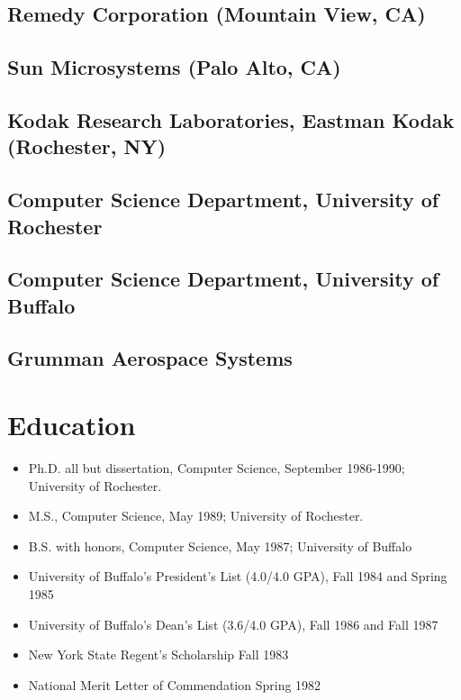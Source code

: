 \documentclass[11pt]{article}
\begin{document}
\subsection*{Remedy Corporation (Mountain View, CA)}
\label{sec-4-6}
\subsection*{Sun Microsystems (Palo Alto, CA)}
\label{sec-4-7}
\subsection*{Kodak Research Laboratories, Eastman Kodak (Rochester, NY)}
\label{sec-4-8}
\subsection*{Computer Science Department, University of Rochester}
\label{sec-4-9}
\subsection*{Computer Science Department, University of Buffalo}
\label{sec-4-10}
\subsection*{Grumman Aerospace Systems}
\label{sec-4-11}
\section*{Education}
\label{sec-5}

\begin{itemize}
\item Ph.D. all but dissertation, Computer Science, September 1986-1990; University of Rochester.
\item M.S., Computer Science, May 1989; University of Rochester.
\item B.S. with honors, Computer Science, May 1987; University of Buffalo
\item University of Buffalo's President's List (4.0/4.0 GPA), Fall 1984 and Spring 1985
\item University of Buffalo's Dean's List (3.6/4.0 GPA), Fall 1986 and Fall 1987
\item New York State Regent's Scholarship Fall 1983
\item National Merit Letter of Commendation Spring 1982
\end{itemize}
\end{document}

